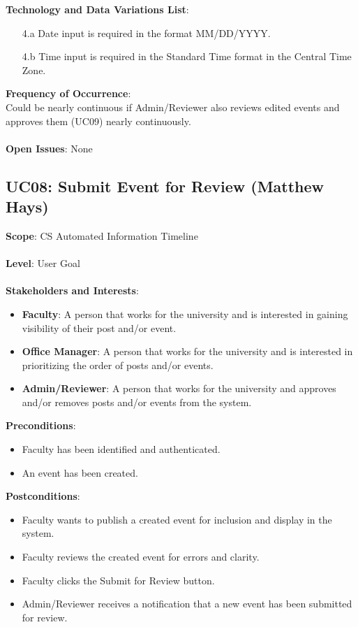 \documentclass{article}
\begin{document}
    \textbf{Technology and Data Variations List}:
    \begin{enumerate}
        \item[4.a] Date input is required in the format MM/DD/YYYY. 
        \item[4.b] Time input is required in the Standard Time format in the Central Time Zone.
    \end{enumerate}
    \textbf{Frequency of Occurrence}:\\
    Could be nearly continuous if Admin/Reviewer also reviews edited events and approves them (UC09) nearly continuously.\\
    \\
    \textbf{Open Issues}: None
    
\subsection{\textbf{UC08}: Submit Event for Review (Matthew Hays)}
 \textbf{Scope}: CS Automated Information Timeline\\
 \\
     \textbf{Level}: User Goal\\
    \\
    \textbf{Stakeholders and Interests}:
    \begin{itemize}[label={}]
         \item \textbf{Faculty}: A person that works for the university and is interested in gaining visibility of their post and/or event.
         \item \textbf{Office Manager}: A person that works for the university and is interested in prioritizing the order of posts and/or events. 
          \item \textbf{Admin/Reviewer}: A person that works for the university and approves and/or removes posts and/or events from the system. 
    \end{itemize}
    \textbf{Preconditions}:
    \begin{itemize}[label={}]
        \item Faculty has been identified and authenticated.
        \item An event has been created. 
    \end{itemize}
    \textbf{Postconditions}:
        \begin{itemize}[label={}]
        \item Faculty wants to publish a created event for inclusion and display in the system. 
        \item Faculty reviews the created event for errors and clarity.
        \item Faculty clicks the Submit for Review button.
        \item Admin/Reviewer receives a notification that a new event has been submitted for review.
    \end{itemize}
\end{document}
